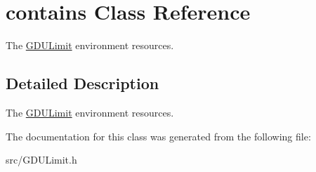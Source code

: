 \hypertarget{classcontains}{
\section{contains Class Reference}
\label{classcontains}
}


The \hyperlink{interface_g_d_u_limit}{GDULimit} environment resources.  


\subsection{Detailed Description}
The \hyperlink{interface_g_d_u_limit}{GDULimit} environment resources. 

The documentation for this class was generated from the following file:\begin{DoxyCompactItemize}
\item 
src/GDULimit.h\end{DoxyCompactItemize}
